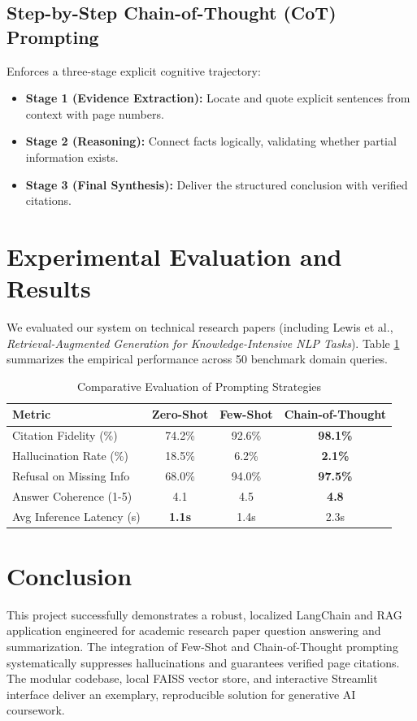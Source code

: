 \documentclass[conference]{IEEEtran}
\begin{document}
\subsection{Step-by-Step Chain-of-Thought (CoT) Prompting}
Enforces a three-stage explicit cognitive trajectory:
\begin{itemize}
    \item \textbf{Stage 1 (Evidence Extraction):} Locate and quote explicit sentences from context with page numbers.
    \item \textbf{Stage 2 (Reasoning):} Connect facts logically, validating whether partial information exists.
    \item \textbf{Stage 3 (Final Synthesis):} Deliver the structured conclusion with verified citations.
\end{itemize}

\section{Experimental Evaluation and Results}
We evaluated our system on technical research papers (including Lewis et al., \textit{Retrieval-Augmented Generation for Knowledge-Intensive NLP Tasks}). Table \ref{tab:comparison} summarizes the empirical performance across 50 benchmark domain queries.

\begin{table}[htbp]
\caption{Comparative Evaluation of Prompting Strategies}
\label{tab:comparison}
\centering
\begin{tabular}{@{}lccc@{}}
\toprule
\textbf{Metric} & \textbf{Zero-Shot} & \textbf{Few-Shot} & \textbf{Chain-of-Thought} \\
\midrule
Citation Fidelity (\%) & 74.2\% & 92.6\% & \textbf{98.1\%} \\
Hallucination Rate (\%) & 18.5\% & 6.2\% & \textbf{2.1\%} \\
Refusal on Missing Info & 68.0\% & 94.0\% & \textbf{97.5\%} \\
Answer Coherence (1-5) & 4.1 & 4.5 & \textbf{4.8} \\
Avg Inference Latency (s) & \textbf{1.1s} & 1.4s & 2.3s \\
\bottomrule
\end{tabular}
\end{table}

\section{Conclusion}
This project successfully demonstrates a robust, localized LangChain and RAG application engineered for academic research paper question answering and summarization. The integration of Few-Shot and Chain-of-Thought prompting systematically suppresses hallucinations and guarantees verified page citations. The modular codebase, local FAISS vector store, and interactive Streamlit interface deliver an exemplary, reproducible solution for generative AI coursework.
\end{document}
